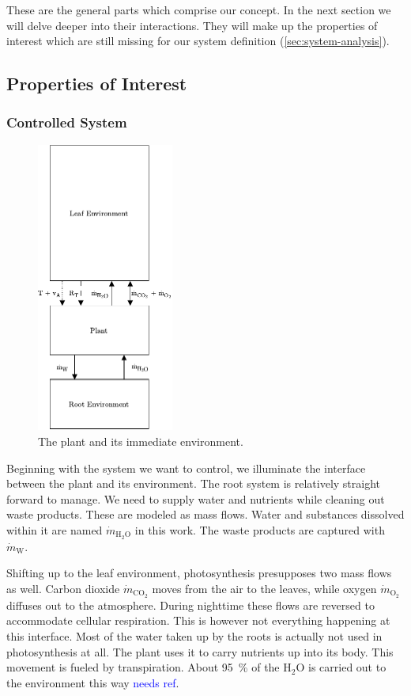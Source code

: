 These are the general parts which comprise our concept.
In the next section we will delve deeper into their interactions.
They will make up the properties of interest which are still missing for our system definition (\ref{sec:system-analysis}).

\subsection{Properties of Interest}
\label{sub:prop-of-interest}

\subsubsection{Controlled System}
\begin{figure}
	\caption{The plant and its immediate environment.}
	\label{wfig:controlled-system}
	\includegraphics[width=0.4\textwidth]{img/controlled-system.pdf}
\end{figure} 

Beginning with the system we want to control, we illuminate the interface between the plant and its environment.
The root system is relatively straight forward to manage.
We need to supply water and nutrients while cleaning out waste products.
These are modeled as mass flows.
Water and substances dissolved within it are named $\dot{m}_{\text{H}_2\text{O}}$ in this work.
The waste products are captured with $\dot{m}_\text{W}$.

Shifting up to the leaf environment, photosynthesis presupposes two mass flows as well.
Carbon dioxide $\dot{m}_{\text{CO}_2}$ moves from the air to the leaves, while oxygen $\dot{m}_{\text{O}_2}$ diffuses out to the atmosphere.
During nighttime these flows are reversed to accommodate cellular respiration.
This is however not everything happening at this interface.
Most of the water taken up by the roots is actually not used in photosynthesis at all.
The plant uses it to carry nutrients up into its body.
This movement is fueled by transpiration.
About \SI{95}{\percent} of the $\text{H}_2\text{O}$ is carried out to the environment this way \textcolor{Blue}{needs ref}.

